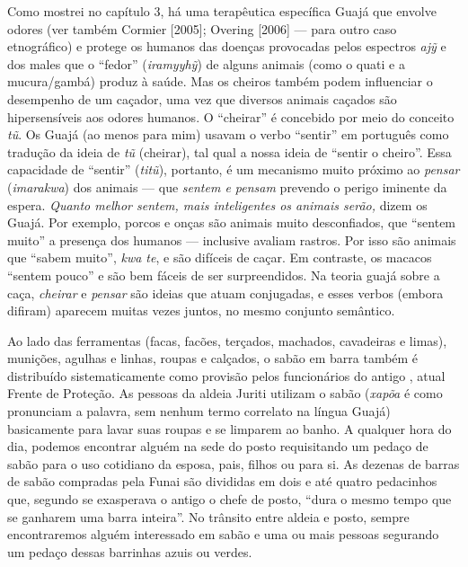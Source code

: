 Como mostrei no capítulo 3, há uma terapêutica específica Guajá que
envolve odores (ver também Cormier {[}2005{]}; Overing {[}2006{]} --- para
outro caso etnográfico) e protege os humanos das doenças provocadas
pelos espectros \emph{ajỹ} e dos males que o ``fedor'' (\emph{iramyyhỹ})
de alguns animais (como o quati e a mucura/gambá) produz à saúde. Mas os
cheiros também podem influenciar o desempenho de um caçador, uma vez que
diversos animais caçados são hipersensíveis aos odores humanos. O
``cheirar'' é concebido por meio do conceito \emph{tũ}. Os Guajá (ao
menos para mim) usavam o verbo ``sentir'' em português como tradução da
ideia de \emph{tũ} (cheirar), tal qual a nossa ideia de ``sentir o
cheiro''. Essa capacidade de ``sentir'' (\emph{titũ}), portanto, é um
mecanismo muito próximo ao \emph{pensar} (\emph{imarakwa}) dos animais ---
que \emph{sentem e pensam} prevendo o perigo iminente da espera.
\emph{Quanto melhor sentem, mais inteligentes os animais serão,} dizem
os Guajá. Por exemplo, porcos e onças são animais muito desconfiados,
que ``sentem muito'' a presença dos humanos --- inclusive avaliam rastros.
Por isso são animais que ``sabem muito'', \emph{kwa te}, e são difíceis de
caçar. Em contraste, os macacos ``sentem pouco'' e são bem fáceis de ser
surpreendidos. Na teoria guajá sobre a caça, \emph{cheirar} e
\emph{pensar} são ideias que atuam conjugadas, e esses verbos (embora
difiram) aparecem muitas vezes juntos, no mesmo conjunto semântico.

Ao lado das ferramentas (facas, facões, terçados, machados, cavadeiras e
limas), munições, agulhas e linhas, roupas e calçados, o sabão em barra
também é distribuído sistematicamente como provisão pelos funcionários
do antigo , atual Frente de Proteção. As pessoas da aldeia Juriti
utilizam o sabão (\emph{xapõa} é como pronunciam a palavra, sem nenhum
termo correlato na língua Guajá) basicamente para lavar suas roupas e se
limparem ao banho. A qualquer hora do dia, podemos encontrar alguém na
sede do posto requisitando um pedaço de sabão para o uso cotidiano da
esposa, pais, filhos ou para si. As dezenas de barras de sabão compradas
pela Funai são divididas em dois e até quatro pedacinhos que, segundo se
exasperava o antigo o chefe de posto, ``dura o mesmo tempo que se
ganharem uma barra inteira''. No trânsito entre aldeia e posto, sempre
encontraremos alguém interessado em sabão e uma ou mais pessoas
segurando um pedaço dessas barrinhas azuis ou verdes.

